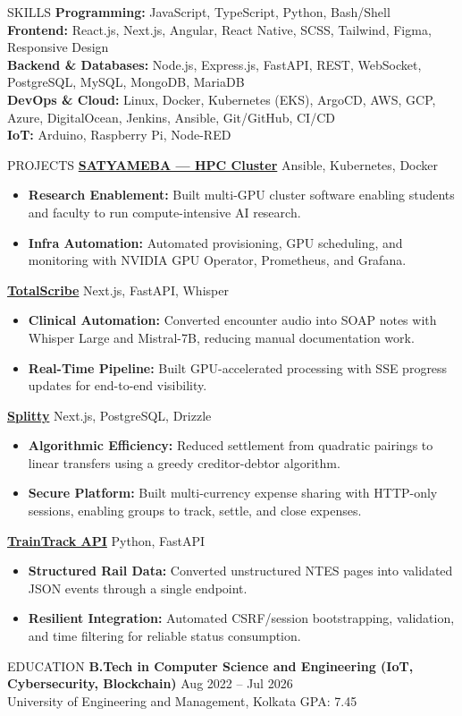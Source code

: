 \documentclass{resume}
\newenvironment{projectitems}{
	\begin{itemize}
		\setlength{\itemsep}{0pt}
		\setlength{\parskip}{0pt}
		\setlength{\parsep}{0pt}
		\setlength{\topsep}{0pt}
		\setlength{\partopsep}{0pt}
		\setlength{\baselineskip}{1.05em}
}{
	\end{itemize}
}
\begin{document}
\begin{rSection}{SKILLS}
	\textbf{Programming:} JavaScript, TypeScript, Python, Bash/Shell \\
	\textbf{Frontend:} React.js, Next.js, Angular, React Native, SCSS, Tailwind, Figma, Responsive Design \\
	\textbf{Backend \& Databases:} Node.js, Express.js, FastAPI, REST, WebSocket, PostgreSQL, MySQL, MongoDB, MariaDB \\
	\textbf{DevOps \& Cloud:} Linux, Docker, Kubernetes (EKS), ArgoCD, AWS, GCP, Azure, DigitalOcean, Jenkins, Ansible, Git/GitHub, CI/CD \\
	\textbf{IoT:} Arduino, Raspberry Pi, Node-RED
\end{rSection}
\begin{rSection}{PROJECTS}
	\textbf{\href{https://www.linkedin.com/posts/arkapravo-ghosh_satyameba-intel-famebot-activity-7383830013416108032-9x59}{SATYAMEBA — HPC Cluster}} \hfill Ansible, Kubernetes, Docker
	\begin{projectitems}
		\item \textbf{Research Enablement:} Built multi-GPU cluster software enabling students and faculty to run compute-intensive AI research.
		\item \textbf{Infra Automation:} Automated provisioning, GPU scheduling, and monitoring with NVIDIA GPU Operator, Prometheus, and Grafana.
	\end{projectitems}
	\textbf{\href{https://github.com/Arkapravo-Ghosh/totalscribe}{TotalScribe}} \hfill Next.js, FastAPI, Whisper
	\begin{projectitems}
		\item \textbf{Clinical Automation:} Converted encounter audio into SOAP notes with Whisper Large and Mistral-7B, reducing manual documentation work.
		\item \textbf{Real-Time Pipeline:} Built GPU-accelerated processing with SSE progress updates for end-to-end visibility.
	\end{projectitems}
	\textbf{\href{https://splitty.arkapravo.in/}{Splitty}} \hfill Next.js, PostgreSQL, Drizzle
	\begin{projectitems}
		\item \textbf{Algorithmic Efficiency:} Reduced settlement from quadratic pairings to linear transfers using a greedy creditor-debtor algorithm.
		\item \textbf{Secure Platform:} Built multi-currency expense sharing with HTTP-only sessions, enabling groups to track, settle, and close expenses.
	\end{projectitems}
	\textbf{\href{https://github.com/Arkapravo-Ghosh/TrainTrack}{TrainTrack API}} \hfill Python, FastAPI
	\begin{projectitems}
		\item \textbf{Structured Rail Data:} Converted unstructured NTES pages into validated JSON events through a single endpoint.
		\item \textbf{Resilient Integration:} Automated CSRF/session bootstrapping, validation, and time filtering for reliable status consumption.
	\end{projectitems}
\end{rSection}
\begin{rSection}{EDUCATION}
	\textbf{B.Tech in Computer Science and Engineering (IoT, Cybersecurity, Blockchain)} \hfill {Aug 2022 -- Jul 2026}\\
	University of Engineering and Management, Kolkata \hfill GPA: 7.45
\end{rSection}
\end{document}
